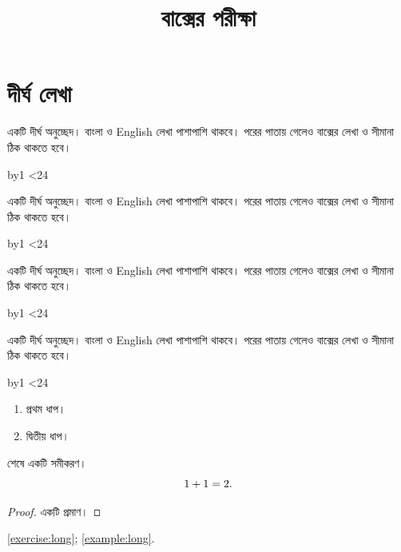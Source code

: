 \documentclass[oneside,openany]{bookbangla}
\title{বাক্সের পরীক্ষা}
\newcommand\longpassage{%
  \repeatcount=0
  \loop
    একটি দীর্ঘ অনুচ্ছেদ। বাংলা ও English লেখা পাশাপাশি থাকবে।
    পরের পাতায় গেলেও বাক্সের লেখা ও সীমানা ঠিক থাকতে হবে।\par
    \advance\repeatcount by1
  \ifnum\repeatcount<24\repeat}
\begin{document}
\mainmatter
\chapter{দীর্ঘ লেখা}
\begin{example}[label=example:long]\longpassage\end{example}
\begin{reminder}[বিশেষ কথা]\longpassage\end{reminder}
\begin{diybox}\longpassage\end{diybox}
\begin{exercise}[hint={এখানে $x^2+y^2$ এবং \textbf{একটি সূত্র} আছে।}]
\label{exercise:long}
\longpassage
\begin{enumerate}\item প্রথম ধাপ।\item দ্বিতীয় ধাপ।\end{enumerate}
\end{exercise}
\begin{solution}[অন্য সমাধান]
শেষে একটি সমীকরণ।
\begin{equation*}1+1=2.\qedhere\end{equation*}
\end{solution}
\begin{proof}একটি প্রমাণ।\end{proof}
\autoref{exercise:long}; \autoref{example:long}.
\end{document}
